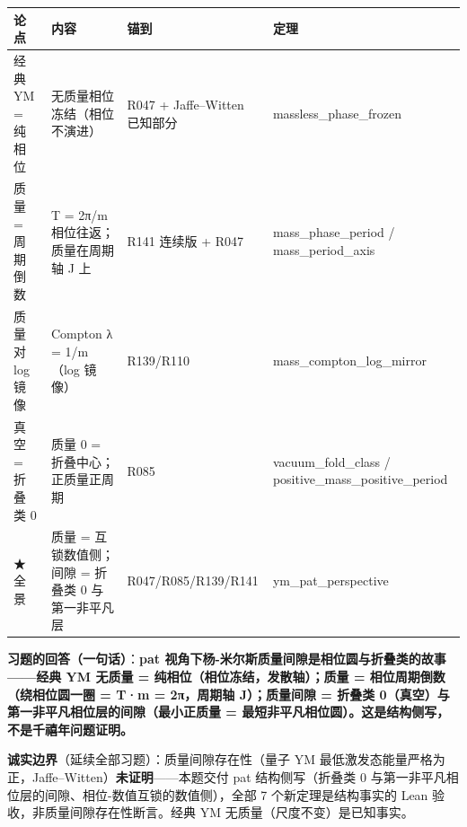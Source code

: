 \documentclass[
]{article}
\newcounter{none} %
\begin{document}
{\def\LTcaptype{none} %
\begin{longtable}[]{@{}
 >{\raggedright\arraybackslash}p{}
 >{\raggedright\arraybackslash}p{}
 >{\raggedright\arraybackslash}p{}
 >{\raggedright\arraybackslash}p{}@{}}
\toprule\noalign{}
\begin{minipage}[b]{\linewidth}\raggedright
论点
\end{minipage} & \begin{minipage}[b]{\linewidth}\raggedright
内容
\end{minipage} & \begin{minipage}[b]{\linewidth}\raggedright
锚到
\end{minipage} & \begin{minipage}[b]{\linewidth}\raggedright
定理
\end{minipage} \\
\midrule\noalign{}
\endhead
\bottomrule\noalign{}
\endlastfoot
经典 YM = 纯相位 & 无质量相位冻结（相位不演进） & R047 + Jaffe--Witten
已知部分 & massless\_phase\_frozen \\
质量 = 周期倒数 & T = 2π/m 相位往返；质量在周期轴 J 上 & R141 连续版 +
R047 & mass\_phase\_period / mass\_period\_axis \\
质量对 log 镜像 & Compton λ = 1/m（log 镜像） & R139/R110 &
mass\_compton\_log\_mirror \\
真空 = 折叠类 0 & 质量 0 = 折叠中心；正质量正周期 & R085 &
vacuum\_fold\_class / positive\_mass\_positive\_period \\
★全景 & 质量 = 互锁数值侧；间隙 = 折叠类 0 与第一非平凡层 &
R047/R085/R139/R141 & ym\_pat\_perspective \\
\end{longtable}
}

\textbf{习题的回答（一句话）}：\textbf{pat
视角下杨-米尔斯质量间隙是相位圆与折叠类的故事------经典 YM 无质量 =
纯相位（相位冻结，发散轴）；质量 = 相位周期倒数（绕相位圆一圈 = T·m =
2π，周期轴 J）；质量间隙 = 折叠类
0（真空）与第一非平凡相位层的间隙（最小正质量 =
最短非平凡相位圆）。这是结构侧写，不是千禧年问题证明。}

\textbf{诚实边界}（延续全部习题）：质量间隙存在性（量子 YM
最低激发态能量严格为正，Jaffe--Witten）\textbf{未证明}------本题交付 pat
结构侧写（折叠类 0
与第一非平凡相位层的间隙、相位-数值互锁的数值侧），全部 7
个新定理是结构事实的 Lean 验收，非质量间隙存在性断言。经典 YM
无质量（尺度不变）是已知事实。
\end{document}
